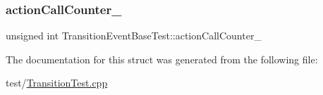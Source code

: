 \subsubsection{\texorpdfstring{action\+Call\+Counter\+\_\+}{actionCallCounter\_}}
{\footnotesize\ttfamily unsigned int Transition\+Event\+Base\+Test\+::action\+Call\+Counter\+\_\+\hspace{0.3cm}{\ttfamily [private]}}



The documentation for this struct was generated from the following file\+:\begin{DoxyCompactItemize}
\item 
test/\mbox{\hyperlink{_transition_test_8cpp}{Transition\+Test.\+cpp}}\end{DoxyCompactItemize}

